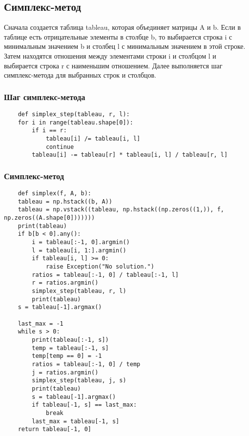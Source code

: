 \documentclass{article}
\begin{document}
\subsection{Симплекс-метод}

Сначала создается таблица tableau, которая объединяет матрицы A и b. Если в таблице есть отрицательные элементы в столбце b, то выбирается строка i с минимальным значением b и столбец l с минимальным значением в этой строке. Затем находятся отношения между элементами строки i и столбцом l и выбирается строка r с наименьшим отношением. Далее выполняется шаг симплекс-метода для выбранных строк и столбцов.

\subsubsection{Шаг симплекс-метода}
\begin{listing}[H]
    \begin{verbatim}
    def simplex_step(tableau, r, l):
    for i in range(tableau.shape[0]):
        if i == r:
            tableau[i] /= tableau[i, l]
            continue
        tableau[i] -= tableau[r] * tableau[i, l] / tableau[r, l]
    \end{verbatim}
\end{listing}

\subsubsection{Симплекс-метод}
\begin{listing}[H]
    \begin{verbatim}
    def simplex(f, A, b):
    tableau = np.hstack((b, A))
    tableau = np.vstack((tableau, np.hstack((np.zeros((1,)), f, np.zeros((A.shape[0]))))))
    print(tableau)
    if b[b < 0].any():
        i = tableau[:-1, 0].argmin()
        l = tableau[i, 1:].argmin()
        if tableau[i, l] >= 0:
            raise Exception("No solution.")
        ratios = tableau[:-1, 0] / tableau[:-1, l]
        r = ratios.argmin()
        simplex_step(tableau, r, l)
        print(tableau)
    s = tableau[-1].argmax()

    last_max = -1
    while s > 0:
        print(tableau[:-1, s])
        temp = tableau[:-1, s]
        temp[temp == 0] = -1
        ratios = tableau[:-1, 0] / temp
        j = ratios.argmin()
        simplex_step(tableau, j, s)
        print(tableau)
        s = tableau[-1].argmax()
        if tableau[-1, s] == last_max:
            break
        last_max = tableau[-1, s]
    return tableau[-1, 0]
    \end{verbatim}
\end{listing}
\end{document}
